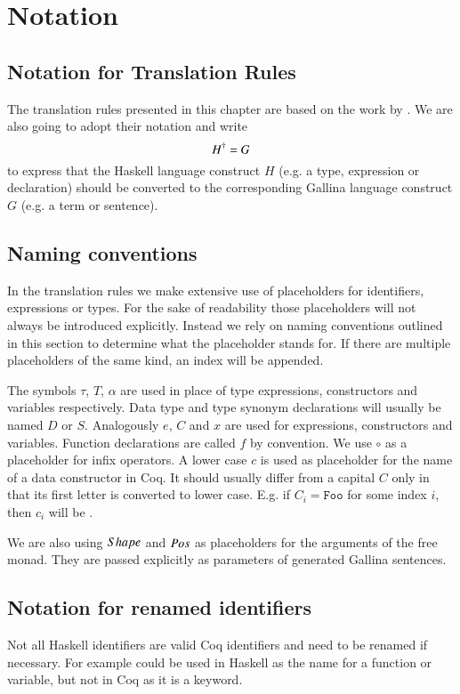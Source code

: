 \section{Notation} \label{sec:translation:notation}
\subsection{Notation for Translation Rules}
The translation rules presented in this chapter are based on the work by \cite{Abel:2005}.
We are also going to adopt their notation and write
\[
  {H}^{\dagger} = G
\]
to express that the Haskell language construct $H$ (e.g. a type, expression or declaration) should be converted to the corresponding Gallina language construct $G$ (e.g. a term or sentence).

\subsection{Naming conventions}
In the translation rules we make extensive use of placeholders for identifiers, expressions or types.
For the sake of readability those placeholders will not always be introduced explicitly.
Instead we rely on naming conventions outlined in this section to determine what the placeholder stands for.
If there are multiple placeholders of the same kind, an index will be appended.

The symbols $\tau$, $T$, $\alpha$ are used in place of type expressions, constructors and variables respectively.
Data type and type synonym declarations will usually be named $D$ or $S$.
Analogously $e$, $C$ and $x$ are used for expressions, constructors and variables.
Function declarations are called $f$ by convention.
We use $\circ$ as a placeholder for infix operators.
A lower case $c$ is used as placeholder for the name of a data constructor in Coq.
It should usually differ from a capital $C$ only in that its first letter is converted to lower case.
E.g. if $C_i = \texttt{Foo}$ for some index $i$, then $c_i$ will be .

We are also using $Shape$ and $Pos$ as placeholders for the arguments of the free monad.
They are passed explicitly as parameters of generated Gallina sentences.

\subsection{Notation for renamed identifiers}
Not all Haskell identifiers are valid Coq identifiers and need to be renamed if necessary.
For example  could be used in Haskell as the name for a function or variable, but not in Coq as it is a keyword.

